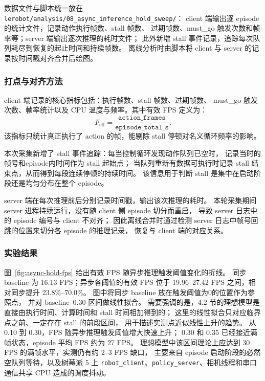 数据文件与脚本统一放在
\texttt{lerobot/analysis/08\_async\_inference\_hold\_sweep/}：
client 端输出逐 episode 的统计文件，记录动作执行帧数、stall 帧数、
过期帧数、must\_go 触发次数和帧率等；server 端输出逐次推理的耗时文件；
此外新增 stall 事件记录，追踪每次队列耗尽到恢复的起止时间和持续帧数。
离线分析时由脚本将 client 与 server 的记录按时间戳对齐合并后绘图。

\subsubsection{打点与对齐方法}\label{sec:async-exp-metrics}

client 端记录的核心指标包括：执行帧数、stall 帧数、过期帧数、
must\_go 触发次数、帧率统计以及 CPU 温度与频率。其中有效 FPS 定义为：
\begin{equation}
  F_{\text{eff}} = \frac{\texttt{action\_frames}}{\texttt{episode\_total\_s}}.
\end{equation}
该指标只统计真正执行了 action 的帧，能剔除 stall 停顿对名义循环频率的影响。

本次采集新增了 stall 事件追踪：每当控制循环发现动作队列已空时，
记录当时的帧号和episode内时间作为 stall 起始点；
当队列重新有数据可执行时记录 stall 结束点，从而得到每段连续停顿的持续时间。
该信息用于判断 stall 是集中在启动阶段还是均匀分布在整个 episode。

server 端在每次推理前后分别记录时间戳，输出该次推理的耗时。
本轮采集期间 server 进程持续运行，没有随 client 侧 episode 切分而重启，
导致 server 日志中的 episode 编号与 client 不对齐；
因此离线合并时通过检测 server 日志中帧号回跳的位置来切分各 episode 的推理记录，
恢复与 client 端的对应关系。

\subsubsection{实验结果}\label{sec:async-exp-results}

图~\ref{fig:async-hold-fps} 给出有效 FPS 随异步推理触发阈值变化的折线。
同步 baseline 为 16.13 FPS；异步各阈值的有效 FPS 位于
19.96--27.42 FPS 之间，相对同步提升 23.8\%--70.0\%。
图中将同步 baseline 放在触发阈值为0的位置作为参照点，
并对 baseline--0.30 区间做线性拟合。
需要强调的是，4.2 节的理想模型是直接由执行时间、计算时间和 stall 时间相加得到的；
这里的线性拟合只对应临界点之前、一定存在 stall 的前段区间，
用于描述实测点近似线性上升的趋势。
从 0.10 到 0.30，FPS 随异步推理触发阈值增大快速上升；
0.30 和 0.35 已经接近满帧状态，episode 平均 FPS 约为 27 FPS。
理想模型中该区间理论上应达到 30 FPS 的满帧水平，实测仍有约 2--3 FPS 缺口，
主要来自 episode 启动阶段的必然空队列等待，以及树莓派 5 上
\texttt{robot\_client}、\texttt{policy\_server}、相机线程和串口通信共享 CPU
造成的调度抖动。

